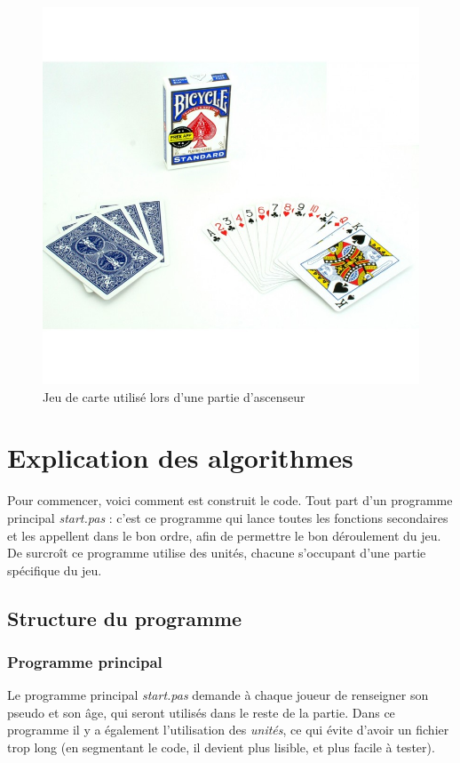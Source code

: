 \documentclass[12pt]{report}
\begin{document}
	\begin{figure}[h]
	\centering
	\includegraphics[scale=0.25]{jeu-de-cartes.jpg}
	 \caption{Jeu de carte utilisé lors d'une partie d'ascenseur}
	\end{figure}
		

		
\clearpage

		
\section{Explication des algorithmes}
Pour commencer, voici comment est construit le code. Tout part d'un programme principal \textit{start.pas} : c'est ce programme qui lance toutes les fonctions secondaires et les appellent dans le bon ordre, afin de permettre le bon déroulement du jeu. De surcroît ce programme utilise des unités, chacune s'occupant d'une partie spécifique du jeu.
  	\subsection{Structure du programme}
  
   \subsubsection{Programme principal}
   Le programme principal \textit{start.pas} demande à chaque joueur de renseigner son pseudo et son âge, qui seront utilisés dans le reste de la partie. Dans ce programme il y a également l'utilisation des \textit{unités}, ce qui évite d'avoir un fichier trop long (en segmentant le code, il devient plus lisible, et plus facile à tester). \\
   
\end{document}
